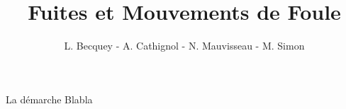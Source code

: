 \documentclass[11pt]{beamer}
\author{L. Becquey - A. Cathignol - N. Mauvisseau - M. Simon}
\title{Fuites et Mouvements de Foule}
\begin{document}
\begin{frame}
\titlepage
\end{frame}


\begin{frame}{La démarche}
Blabla
\end{frame}
\end{document}
